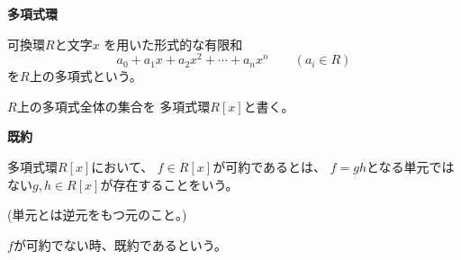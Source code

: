\documentclass[12pt,b5paper]{ltjsarticle}
\begin{document}
\hrulefill

\textbf{多項式環}

可換環$R$と文字$x$
を用いた形式的な有限和
\begin{equation}
 a_0+a_1x+a_2x^2+\cdots+a_nx^n
  \qquad (a_i\in R)
\end{equation}
を$R$上の多項式という。

$R$上の多項式全体の集合を
多項式環$R[x]$と書く。

\hrulefill

\textbf{既約}

多項式環$R[x]$において、
$f\in R[x]$が可約であるとは、
$f=gh$となる単元ではない$g,h\in R[x]$が存在することをいう。

(単元とは逆元をもつ元のこと。)

$f$が可約でない時、既約であるという。

\hrulefill
\end{document}
